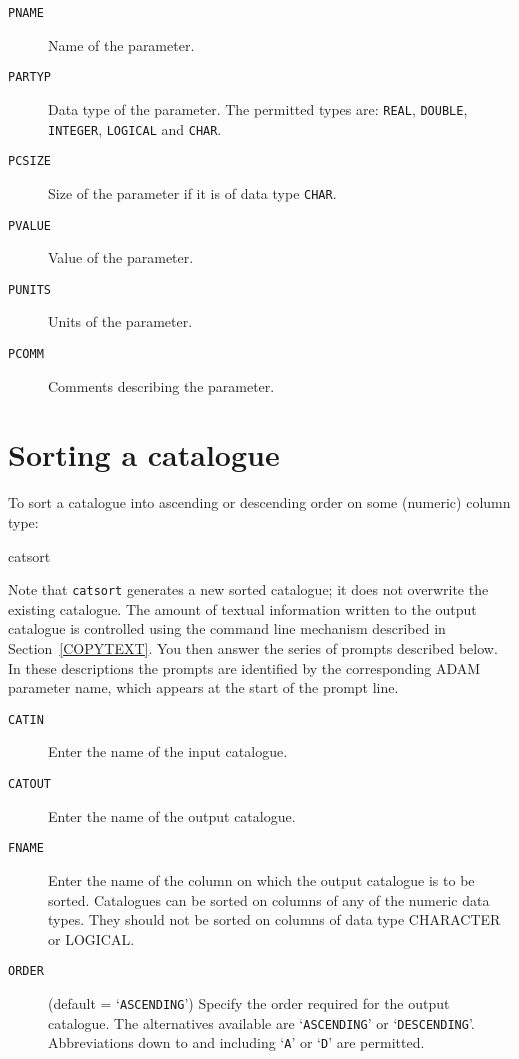 \documentclass[twoside,11pt]{starlink}
\begin{document}
\begin{description}

  \item[ \texttt{PNAME} ] Name of the parameter.

  \item[ \texttt{PARTYP} ] Data type of the parameter.  The permitted types
   are: \texttt{REAL}, \texttt{DOUBLE}, \texttt{INTEGER}, \texttt{LOGICAL} and \texttt{CHAR}.

  \item[ \texttt{PCSIZE} ] Size of the parameter if it is of data type \texttt{CHAR}.

  \item[ \texttt{PVALUE} ] Value of the parameter.

  \item[ \texttt{PUNITS} ] Units of the parameter.

  \item[ \texttt{PCOMM} ] Comments describing the parameter.

\end{description}


\section{\label{SORT}Sorting a catalogue}

To sort a catalogue into ascending or descending order on some (numeric)
column type:

\begin{terminalv}
catsort
\end{terminalv}

Note that \texttt{catsort} generates a new sorted catalogue; it does not
overwrite the existing catalogue. The amount of textual information
written to the output catalogue is controlled using the command line
mechanism described in Section~\ref{COPYTEXT}.  You then answer the
series of prompts described below.  In these descriptions the prompts
are identified by the corresponding ADAM parameter name, which appears at
the start of the prompt line.

\begin{description}

  \item[ \texttt{CATIN} ] Enter the name of the input catalogue.

  \item[ \texttt{CATOUT} ] Enter the name of the output catalogue.

  \item[ \texttt{FNAME} ] Enter the name of the column on which the output
   catalogue is to be sorted.  Catalogues can be sorted on columns of any
   of the numeric data types.  They should not be sorted on columns of
   data type CHARACTER or LOGICAL.

  \item[ \texttt{ORDER} ] (default = `\texttt{ASCENDING}') Specify the order
   required for the output    catalogue.  The alternatives available are
   `\texttt{ASCENDING}' or `\texttt{DESCENDING}'.  Abbreviations down to and
   including `\texttt{A}' or `\texttt{D}' are permitted.

\end{description}
\end{document}
